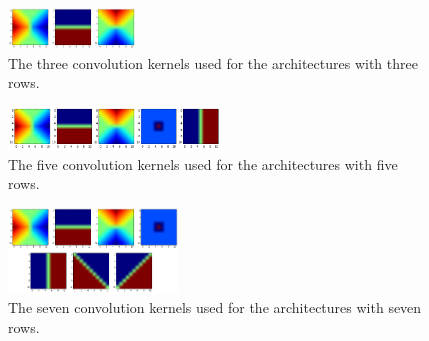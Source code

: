 \documentclass[a4paper,onecolumn]{report}
\begin{document}
\begin{appendices}
\begin{tiny}
\begin{center}
\begin{tabular}{| l |p{0.5cm} |p{0.5cm} |p{0.5cm} |p{0.75cm} |p{0.7cm} |p{0.7cm} |p{0.75cm} |p{0.75cm} |p{0.75cm} |p{0.5cm} |p{0.8cm} |p{0.8cm} |p{0.8cm} |r | }
			
		\end{tabular}
	\end{center}
\end{tiny}	


\begin{figure}[bth!]
	\centering
	\includegraphics[width=0.3\textwidth]{./images/3filters.jpg}
	\caption{The three convolution kernels used for the architectures with three rows.}
	\label{fig:3filters}
\end{figure}

\begin{figure}[bth!]
	\centering
	\includegraphics[width=0.5\textwidth]{./images/5filters.jpg}
	\caption{The five convolution kernels used for the architectures with five rows.}
	\label{fig:5filters}
\end{figure}

\begin{figure}[bth!]
	\centering
	\includegraphics[width=0.4\textwidth]{./images/7filters.jpg}
	\caption{The seven convolution kernels used for the architectures with seven rows.}
	\label{fig:7filters}
\end{figure}

\end{appendices}
\end{document}
